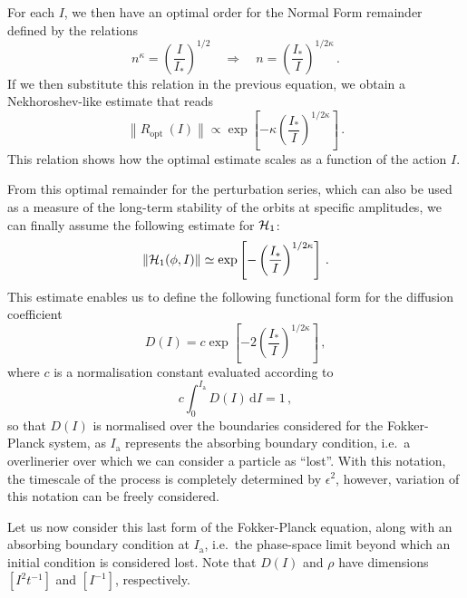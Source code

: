 For each $I$, we then have an optimal order for the Normal Form remainder defined by the relations
\begin{equation}
    n^\kappa=\left(\frac{I}{I_\ast}\right)^{1 / 2} \quad \Rightarrow \quad n=\left(\frac{I_\ast}{I}\right)^{1 / 2 \kappa} \,.
\end{equation}
If we then substitute this relation in the previous equation, we obtain a Nekhoroshev-like estimate that reads
\begin{equation}
    \left\|R_{\text {opt }}(I)\right\| \propto \exp \left[-\kappa\left(\frac{I_*}{I}\right)^{1 / 2 \kappa}\right] \,.
\end{equation}
This relation shows how the optimal estimate scales as a function of the action $I$. 

From this optimal remainder for the perturbation series, which can also be used as a measure of the long-term stability of the orbits at specific amplitudes, we can finally assume the following estimate for $\mathcal{H}_1$:
\begin{equation}
    \left\|\mathcal{H}_1(\phi, I)\right\| \simeq \exp \left[-\left(\frac{I_\ast}{I}\right)^{1/2\kappa}\right] \,.
\end{equation}
This estimate enables us to define the following functional form for the diffusion coefficient
\begin{equation}
    D(I) = c \exp\left[-2\left(\frac{I_\ast}{I}\right)^{1/2\kappa}\right]\,,
    \label{eq:diffusion}
\end{equation}
where $c$ is a normalisation constant evaluated according to
\begin{equation}
    c \int_0^{I_\text{a}} D(I)\,\mathrm{d}I = 1 \,,
\end{equation}
so that $D(I)$ is normalised over the boundaries considered for the Fokker-Planck system, as $I_\text{a}$ represents the absorbing boundary condition, i.e.\ a overlinerier over which we can consider a particle as ``lost''. With this notation, the timescale of the process is completely determined by $\epsilon^2$, however, variation of this notation can be freely considered.

Let us now consider this last form of the Fokker-Planck equation, along with an absorbing boundary condition at $I_{\mathrm{a}}$, i.e.\ the phase-space limit beyond which an initial condition is considered lost. Note that $D(I)$ and $\rho$ have dimensions $[I^2t^{-1}]$ and $[I^{-1}]$, respectively.

